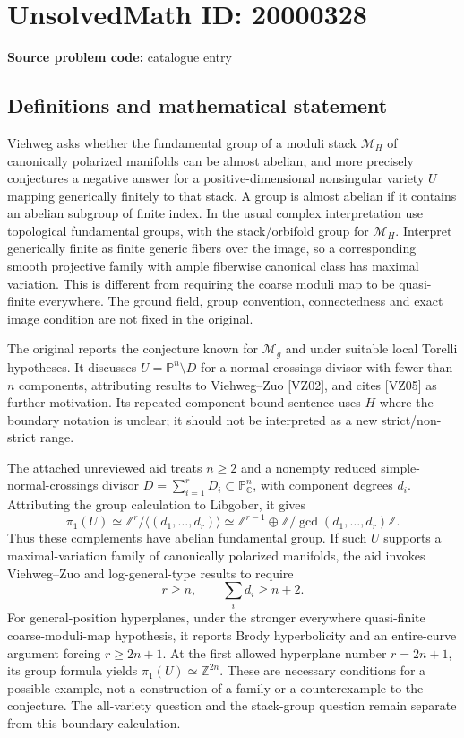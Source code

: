 \documentclass[11pt]{article}
\newcommand{\Z}{\mathbb{Z}}
\newcommand{\C}{\mathbb{C}}
\newcommand{\PP}{\mathbb{P}}
\begin{document}
\section*{UnsolvedMath ID: 20000328}
\textbf{Source problem code:} catalogue entry
\subsection{Definitions and mathematical statement}
Viehweg asks whether the fundamental group of a moduli stack $\mathcal M_H$ of canonically polarized manifolds can be almost abelian, and more precisely conjectures a negative answer for a positive-dimensional nonsingular variety $U$ mapping generically finitely to that stack. A group is almost abelian if it contains an abelian subgroup of finite index. In the usual complex interpretation use topological fundamental groups, with the stack/orbifold group for $\mathcal M_H$. Interpret generically finite as finite generic fibers over the image, so a corresponding smooth projective family with ample fiberwise canonical class has maximal variation. This is different from requiring the coarse moduli map to be quasi-finite everywhere. The ground field, group convention, connectedness and exact image condition are not fixed in the original.

The original reports the conjecture known for $\mathcal M_g$ and under suitable local Torelli hypotheses. It discusses $U=\PP^n\setminus D$ for a normal-crossings divisor with fewer than $n$ components, attributing results to Viehweg--Zuo [VZ02], and cites [VZ05] as further motivation. Its repeated component-bound sentence uses $H$ where the boundary notation is unclear; it should not be interpreted as a new strict/non-strict range.

The attached unreviewed aid treats $n\ge2$ and a nonempty reduced simple-normal-crossings divisor $D=\sum_{i=1}^r D_i\subset\PP^n_\C$, with component degrees $d_i$. Attributing the group calculation to Libgober, it gives
\[
\pi_1(U)\simeq\Z^r/\langle(d_1,\ldots,d_r)\rangle
\simeq\Z^{r-1}\oplus\Z/\gcd(d_1,\ldots,d_r)\Z.
\]
Thus these complements have abelian fundamental group. If such $U$ supports a maximal-variation family of canonically polarized manifolds, the aid invokes Viehweg--Zuo and log-general-type results to require
\[
r\ge n,\qquad\sum_i d_i\ge n+2.
\]
For general-position hyperplanes, under the stronger everywhere quasi-finite coarse-moduli-map hypothesis, it reports Brody hyperbolicity and an entire-curve argument forcing $r\ge2n+1$. At the first allowed hyperplane number $r=2n+1$, its group formula yields $\pi_1(U)\simeq\Z^{2n}$. These are necessary conditions for a possible example, not a construction of a family or a counterexample to the conjecture. The all-variety question and the stack-group question remain separate from this boundary calculation.
\end{document}

